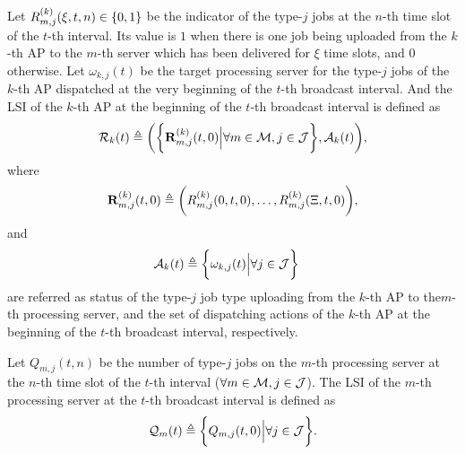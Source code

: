 \begin{definition}
    Let $R^{(k)}_{m,j}(\xi,t,n) \in \{0,1\}$ be the indicator of the type-$j$ jobs at the $n$-th time slot of the $t$-th interval.
    Its value is $1$ when there is one job being uploaded from the $k$-th AP to the $m$-th server which has been delivered for $\xi$ time slots, and $0$ otherwise.
    Let $\omega_{k,j}(t)$ be the target processing server for the type-$j$ jobs of the $k$-th AP dispatched at the very beginning of the $t$-th broadcast interval.
    And the LSI of the $k$-th AP at the beginning of the $t$-th broadcast interval is defined as
    {\small
    \begin{align}
        \mathcal{R}_{k}(t) \triangleq
        \bigg(
            \bigg\{\mathbf{R}^{(k)}_{m,j}(t,0) \Big| \forall m\in\mathcal{M},j\in\mathcal{J}\bigg\},
            \mathcal{A}_{k}(t)
        \bigg),
    \end{align}
    }%
    where
    {\small
    \begin{align}
        \mathbf{R}^{(k)}_{m,j}(t,0) \triangleq \bigg(
            R^{(k)}_{m,j}(0,t,0), \dots, R^{(k)}_{m,j}(\Xi,t,0)
        \bigg),
    \end{align}
    }%
    and
    {\small
    \begin{align}
        \mathcal{A}_{k}(t) &\triangleq \bigg\{\omega_{k,j}(t) \Big| \forall j\in\mathcal{J}\bigg\}
    \end{align}
    }%
    are referred as status of the type-$j$ job type uploading from the $k$-th AP to the$m$-th processing server, and the set of dispatching actions of the $k$-th AP at the beginning of the $t$-th broadcast interval, respectively.
\end{definition}

\begin{definition}
    Let $Q_{m,j}({t,n})$ be the number of type-$j$ jobs on the $m$-th processing server at the $n$-th time slot of the $t$-th interval ($\forall m\in\mathcal{M}, j\in\mathcal{J}$).
    The LSI of the $m$-th processing server at the $t$-th broadcast interval is defined as
    {\small
    \begin{align}
        \mathcal{Q}_{m}(t) \triangleq \bigg\{
            Q_{m,j}(t, 0) \Big| \forall j\in\mathcal{J}
        \bigg\}.
    \end{align}
    }%
\end{definition}

